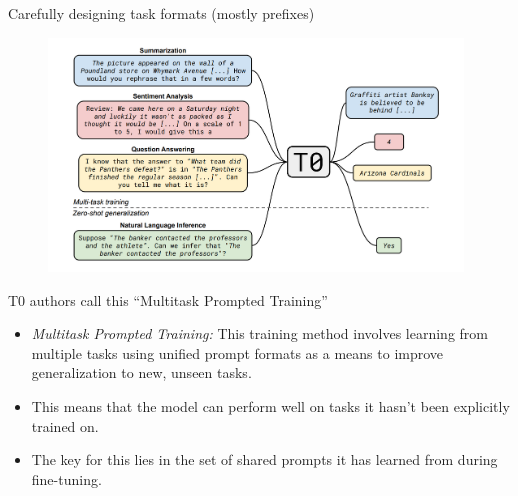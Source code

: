 \begin{frame}{Carefully designing task formats (mostly prefixes)}

\vfill
	
	\begin{figure}
		\centering
		\includegraphics[width = 11cm]{figure/81-t0.png}\\ 
	\end{figure}

\vfill

\end{frame}


\begin{frame}{T0 authors call this ``Multitask Prompted
		Training''}

\vfill

\begin{itemize}
    \item \textit{Multitask Prompted Training:} This
    training method involves learning from multiple
    tasks using unified prompt formats as a means to improve
    generalization to new, unseen tasks.
    \item This means that the model can perform well on tasks it hasn't been explicitly trained on.
    \item The key for this lies in the set of shared prompts it has learned from during fine-tuning.
\end{itemize}

\vfill

\end{frame}



